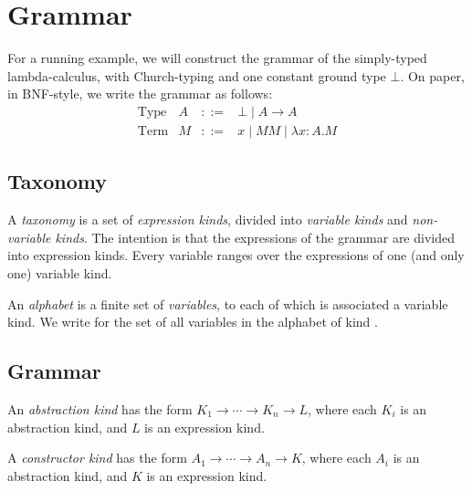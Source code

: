 \documentclass[envcountsame]{llncs}
\begin{document}
\section{Grammar}

\begin{example}
\label{ex:stlc}
For a running example, we will construct the grammar of the simply-typed lambda-calculus, with Church-typing and one constant ground type $\bot$.  On paper, in BNF-style, we write the grammar as follows:
\[ \begin{array}{lrcl}
\text{Type} & A & ::= & \bot \mid A \rightarrow A \\
\text{Term} & M & ::= & x \mid MM \mid \lambda x : A . M
\end{array} \]
\end{example}

\subsection{Taxonomy}

A \emph{taxonomy} is a set of \emph{expression kinds}, divided into \emph{variable kinds} and \emph{non-variable kinds}.
The intention is that the expressions of the grammar are divided into expression kinds.  Every
variable ranges over the expressions of one (and only one) variable kind.


An \emph{alphabet} is a finite set of \emph{variables}, to each of which is associated a variable kind.  We write   
for the set of all variables in the alphabet  of kind .


\subsection{Grammar}

\begin{definition}
\label{df:kinds}
An \emph{abstraction kind} has the form $K_1 \rightarrow \cdots \rightarrow K_n \rightarrow L$,
where each $K_i$ is an abstraction kind, and $L$ is an expression kind.

A \emph{constructor kind} has the form $A_1 \rightarrow \cdots \rightarrow A_n \rightarrow K$,
where each $A_i$ is an abstraction kind, and $K$ is an expression kind.
\end{definition}
\end{document}
